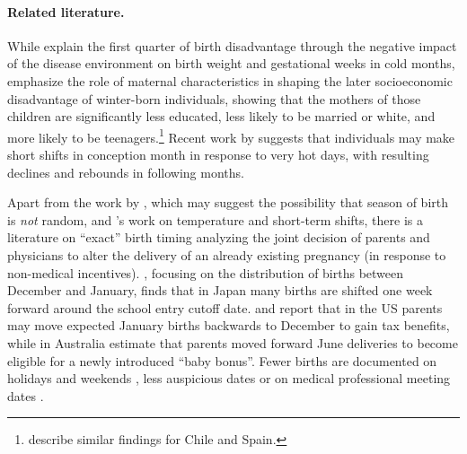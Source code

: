 \documentclass[a4paper, 12 pt]{article}
\theoremstyle{plain}
\begin{document}
\begin{doublespace}


\paragraph{Related literature.} While \citet{CS2013} explain the first quarter of birth disadvantage through the negative impact of the disease environment on birth weight and gestational weeks in cold months, \citet{BucklesHungerman2013} emphasize the role of maternal characteristics in shaping the later socioeconomic disadvantage of winter-born individuals, showing that the mothers of those children are significantly less educated, less likely to be married or white, and more likely to be teenagers.\footnote{\citet{AlbaCaceres2014} describe similar findings for Chile and Spain.} Recent work by \citet{Barrecaetal2015} suggests that individuals may make short shifts in conception month in response to very hot days, with resulting declines and rebounds in following months.

Apart from the work by \citet{BucklesHungerman2013}, which may suggest the possibility that season of birth is \emph{not} random, and \citet{Barrecaetal2015}'s work on temperature and short-term shifts, there is a literature on ``exact'' birth timing analyzing the joint decision of parents and physicians to alter the delivery of an already existing pregnancy (in response to non-medical incentives). \citet{Shigeoka2015}, focusing on the distribution of births between December and January,  finds that in Japan many births are shifted one week forward around the school entry cutoff date. \citet{DCChandra1999} and \citet{LaLumiaetal2015} report that in the US parents may move expected January births backwards to December to gain tax benefits, while in Australia \citet{GansLeigh2009} estimate that parents moved forward June deliveries to become eligible for a newly introduced ``baby bonus''. Fewer births are documented on holidays \citep{Rindfuss1979} and weekends \citep{Gould2003}, less auspicious dates \citep{Almond15} or on medical professional meeting dates \citep{GLV2007}. 


\end{doublespace}
\end{document}
